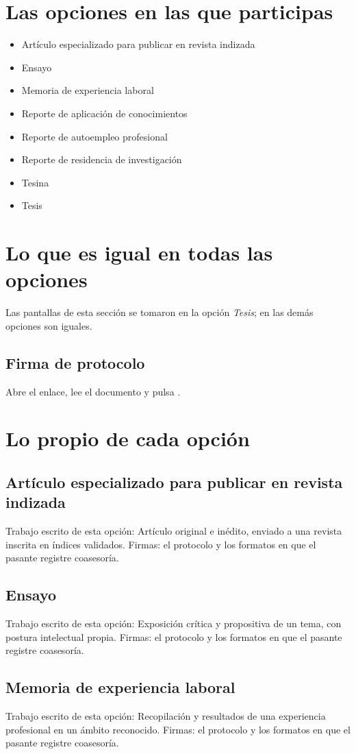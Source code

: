 \section{Las opciones en las que participas}
\begin{itemize}
  \item Artículo especializado para publicar en revista indizada
  \item Ensayo
  \item Memoria de experiencia laboral
  \item Reporte de aplicación de conocimientos
  \item Reporte de autoempleo profesional
  \item Reporte de residencia de investigación
  \item Tesina
  \item Tesis
\end{itemize}
\section{Lo que es igual en todas las opciones}
Las pantallas de esta sección se tomaron en la opción \emph{Tesis}; en las demás opciones son iguales.
\subsection{Firma de protocolo}
Abre el enlace, lee el documento y pulsa .
\section{Lo propio de cada opción}
\subsection{Artículo especializado para publicar en revista indizada}
Trabajo escrito de esta opción: Artículo original e inédito, enviado a una revista inscrita en índices validados. Firmas: el protocolo y los formatos en que el pasante registre coasesoría.
\subsection{Ensayo}
Trabajo escrito de esta opción: Exposición crítica y propositiva de un tema, con postura intelectual propia. Firmas: el protocolo y los formatos en que el pasante registre coasesoría.
\subsection{Memoria de experiencia laboral}
Trabajo escrito de esta opción: Recopilación y resultados de una experiencia profesional en un ámbito reconocido. Firmas: el protocolo y los formatos en que el pasante registre coasesoría.

